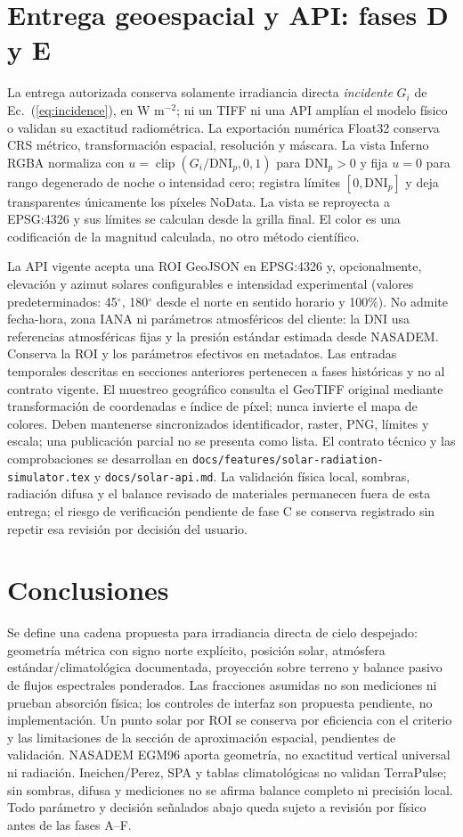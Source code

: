 \documentclass[11pt,a4paper]{article}
\begin{document}
\section{Entrega geoespacial y API: fases D y E}
La entrega autorizada conserva solamente irradiancia directa \emph{incidente} $G_i$ de Ec.~(\ref{eq:incidence}), en W m$^{-2}$; ni un TIFF ni una API amplían el modelo físico o validan su exactitud radiométrica. La exportación numérica Float32 conserva CRS métrico, transformación espacial, resolución y máscara. La vista Inferno RGBA normaliza con $u=\operatorname{clip}(G_i/\mathrm{DNI}_{p},0,1)$ para $\mathrm{DNI}_{p}>0$ y fija $u=0$ para rango degenerado de noche o intensidad cero; registra límites $[0,\mathrm{DNI}_{p}]$ y deja transparentes únicamente los píxeles NoData. La vista se reproyecta a EPSG:4326 y sus límites se calculan desde la grilla final. El color es una codificación de la magnitud calculada, no otro método científico.

La API vigente acepta una ROI GeoJSON en EPSG:4326 y, opcionalmente, elevación y azimut solares configurables e intensidad experimental (valores predeterminados: 45$^\circ$, 180$^\circ$ desde el norte en sentido horario y 100\%). No admite fecha-hora, zona IANA ni parámetros atmosféricos del cliente: la DNI usa referencias atmosféricas fijas y la presión estándar estimada desde NASADEM. Conserva la ROI y los parámetros efectivos en metadatos. Las entradas temporales descritas en secciones anteriores pertenecen a fases históricas y no al contrato vigente. El muestreo geográfico consulta el GeoTIFF original mediante transformación de coordenadas e índice de píxel; nunca invierte el mapa de colores. Deben mantenerse sincronizados identificador, raster, PNG, límites y escala; una publicación parcial no se presenta como lista. El contrato técnico y las comprobaciones se desarrollan en \texttt{docs/features/solar-radiation-simulator.tex} y \texttt{docs/solar-api.md}. La validación física local, sombras, radiación difusa y el balance revisado de materiales permanecen fuera de esta entrega; el riesgo de verificación pendiente de fase C se conserva registrado sin repetir esa revisión por decisión del usuario.

\section{Conclusiones}
Se define una cadena propuesta para irradiancia directa de cielo despejado: geometría métrica con signo norte explícito, posición solar, atmósfera estándar/climatológica documentada, proyección sobre terreno y balance pasivo de flujos espectrales ponderados. Las fracciones asumidas no son mediciones ni prueban absorción física; los controles de interfaz son propuesta pendiente, no implementación. Un punto solar por ROI se conserva por eficiencia con el criterio y las limitaciones de la sección de aproximación espacial, pendientes de validación. NASADEM EGM96 aporta geometría, no exactitud vertical universal ni radiación. Ineichen/Perez, SPA y tablas climatológicas no validan TerraPulse; sin sombras, difusa y mediciones no se afirma balance completo ni precisión local. Todo parámetro y decisión señalados abajo queda sujeto a revisión por físico antes de las fases A--F.
\end{document}
